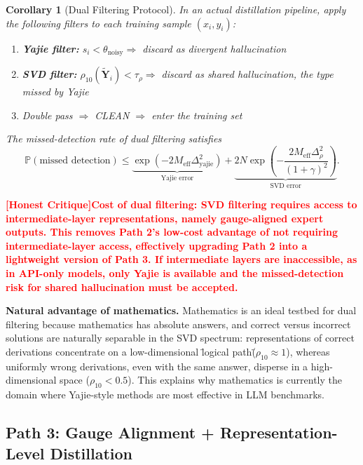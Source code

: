 \documentclass[12pt,a4paper]{article}
\newtheorem{corollary}[theorem]{Corollary}
\theoremstyle{remark}
\newcommand{\Pbb}{\mathbb{P}}
\newcommand{\honestcrit}[1]{%
    \textcolor{red}{\textbf{[Honest Critique]#1}}%
}
\begin{document}
\begin{corollary}[Dual Filtering Protocol]\label{cor:dual_filter}
In an actual distillation pipeline, apply the following filters to each training sample $(x_i, y_i)$:
\begin{enumerate}[label=(\roman*)]
    \item \textbf{Yajie filter:} $s_i < \theta_{\text{noisy}} \Rightarrow$ discard as divergent hallucination
    \item \textbf{SVD filter:} $\rho_{10}(\tilde{\mathbf{Y}}_i) < \tau_\rho \Rightarrow$ discard as shared hallucination, the type missed by Yajie
    \item Double pass $\Rightarrow$ CLEAN $\Rightarrow$ enter the training set
\end{enumerate}
The missed-detection rate of dual filtering satisfies
\begin{equation}
    \Pbb(\text{missed detection}) \leq \underbrace{\exp(-2 M_{\text{eff}} \Delta_{\text{yajie}}^2)}_{\text{Yajie error}} + \underbrace{2N\exp\left(-\frac{2 M_{\text{eff}} \Delta_\rho^2}{(1 + \gamma)^2}\right)}_{\text{SVD error}}.
\end{equation}
\end{corollary}

\honestcrit{Cost of dual filtering: SVD filtering requires access to intermediate-layer representations, namely gauge-aligned expert outputs. This removes Path 2's low-cost advantage of not requiring intermediate-layer access, effectively upgrading Path 2 into a lightweight version of Path 3. If intermediate layers are inaccessible, as in API-only models, only Yajie is available and the missed-detection risk for shared hallucination must be accepted.}

\textbf{Natural advantage of mathematics.} Mathematics is an ideal testbed for dual filtering because mathematics has absolute answers, and correct versus incorrect solutions are naturally separable in the SVD spectrum: representations of correct derivations concentrate on a low-dimensional \"logical path\" ($\rho_{10} \approx 1$), whereas uniformly wrong derivations, even with the same answer, disperse in a high-dimensional space ($\rho_{10} < 0.5$). This explains why mathematics is currently the domain where Yajie-style methods are most effective in LLM benchmarks.

\subsection{Path 3: Gauge Alignment + Representation-Level Distillation}
\end{document}
